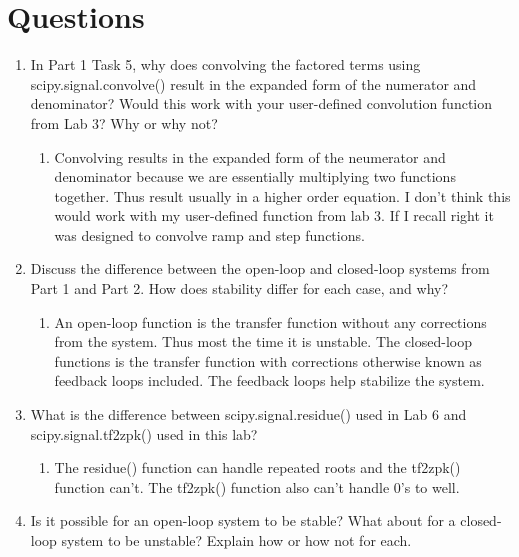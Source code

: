 \documentclass[12pt]{article}
\begin{document}
\section{Questions}
 \begin{enumerate}
     \item In Part 1 Task 5, why does convolving the factored terms using scipy.signal.convolve()
result in the expanded form of the numerator and denominator? Would this work with your
user-defined convolution function from Lab 3? Why or why not?

    \begin{enumerate}
        \item Convolving results in the expanded form of the neumerator and denominator because we are essentially multiplying two functions together. Thus result usually in a higher order equation. I don't think this would work with my user-defined function from lab 3. If I recall right it was designed to convolve ramp and step functions.
    \end{enumerate}

    \item Discuss the difference between the open-loop and closed-loop systems from Part 1 and Part 2.
How does stability differ for each case, and why?

    \begin{enumerate}
        \item An open-loop function is the transfer function without any corrections from the system. Thus most the time it is unstable. The closed-loop functions is the transfer function with corrections otherwise known as feedback loops included. The feedback loops help stabilize the system.
    \end{enumerate}
    
    \item What is the difference between scipy.signal.residue() used in Lab 6 and
scipy.signal.tf2zpk() used in this lab?

    \begin{enumerate}
        \item The residue() function can handle repeated roots and the tf2zpk() function can't. The tf2zpk() function also can't handle 0's to well.
    \end{enumerate}
    
    \item Is it possible for an open-loop system to be stable? What about for a closed-loop system to
be unstable? Explain how or how not for each.


\end{enumerate}
\end{document}
